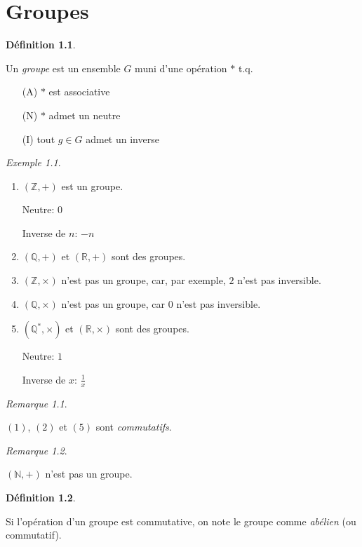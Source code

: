 \documentclass{report}
\theoremstyle{definition}
\newtheorem*{defin}{D\'efinition}
\theoremstyle{remark}
\newtheorem*{exem}{Exemple}
\newtheorem*{rema}{Remarque}
\begin{document}
	\chapter{Groupes}
	\begin{defin}
		~

		Un \emph{groupe} est un ensemble $G$ muni d'une op\'eration $*$ t.q.
		\begin{enumerate}
			\item[(A)] $*$ est associative
			\item[(N)] $*$ admet un neutre
			\item[(I)] tout $g \in G$ admet un inverse
		\end{enumerate}
	\end{defin}
	\begin{exem}
		~

		\begin{enumerate}[label=(\arabic*)]
			\item $(\mathbb{Z},+)$ est un groupe.

			Neutre: $0$

			Inverse de $n$: $-n$
			\item $(\mathbb{Q},+)$ et $(\mathbb{R},+)$ sont des groupes.
			\item $(\mathbb{Z},\times)$ n'est pas un groupe, car, par exemple, $2$ n'est pas inversible.
			\item $(\mathbb{Q},\times)$ n'est pas un groupe, car $0$ n'est pas inversible.
			\item $(\mathbb{Q}^*,\times)$ et $(\mathbb{R},\times)$ sont des groupes.

			Neutre: $1$

			Inverse de $x$: $\frac{1}{x}$
		\end{enumerate}
		\begin{rema}
			~

			$(1)$, $(2)$ et $(5)$ sont \emph{commutatifs}.
		\end{rema}
		\begin{rema}
			~

			$(\mathbb{N},+)$ n'est pas un groupe.
		\end{rema}
	\end{exem}
	\begin{defin}
		~

		Si l'op\'eration d'un groupe est commutative, on note le groupe comme \emph{ab\'elien} (ou commutatif).
	\end{defin}
\end{document}
